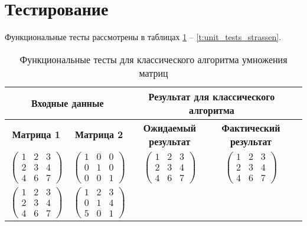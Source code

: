 \section{Тестирование}
Функциональные  тесты рассмотрены в таблицах \ref{t:unit_tests_def} -- \ref{t:unit_tests_strassen}.
\begin{table}[ht]
	\small
	\begin{center}
		\begin{threeparttable}
			\caption{Функциональные тесты для классического алгоритма умножения матриц}
			\label{t:unit_tests_def}
			\begin{tabular}{|c|c|c|c|c|}
				\hline
				\multicolumn{2}{|c|}{\bfseries Входные данные}
				& \multicolumn{2}{c|}{\bfseries Результат для классического алгоритма} \\
				\hline 
				\bfseries Матрица 1
				& \bfseries Матрица 2
				& \bfseries Ожидаемый результат
				& \bfseries Фактический результат \\
				\hline
				$\begin{pmatrix}
					1 & 2 & 3\\
					2 & 3 & 4\\
					4 & 6 & 7
				\end{pmatrix}$ 
				&  
				$\begin{pmatrix}
					1 & 0 & 0\\
					0 & 1 & 0\\
					0 & 0 & 1
				\end{pmatrix}$
				&
				$\begin{pmatrix}
					1 & 2 & 3\\
					2 & 3 & 4\\
					4 & 6 & 7
				\end{pmatrix}$ 
				&
				$\begin{pmatrix}
					1 & 2 & 3\\
					2 & 3 & 4\\
					4 & 6 & 7
				\end{pmatrix}$  \\ 
				\hline
				$\begin{pmatrix}
					1 & 2 & 3\\
					2 & 3 & 4\\
					4 & 6 & 7
				\end{pmatrix}$ 
				&  
				$\begin{pmatrix}
					1 & 2 & 3\\
					0 & 1 & 4\\
					5 & 0 & 1
				\end{pmatrix}$

\end{tabular}
\end{threeparttable}
\end{center}
\end{table}
